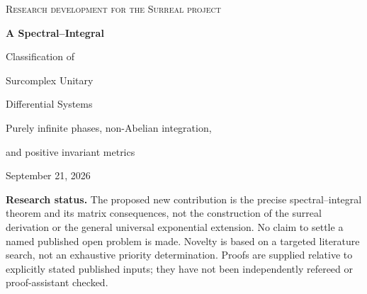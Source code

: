 \documentclass[11pt,a4paper]{article}
\numberwithin{equation}{section}
\theoremstyle{definition}
\theoremstyle{remark}
\newcommand{\No}{\mathbf{No}}
\newcommand{\K}{\mathbb K}
\newcommand{\OO}{\mathcal O}
\newcommand{\II}{\mathcal I}
\begin{document}
\hypersetup{pageanchor=false}
\begin{titlepage}
\centering
\vspace*{8mm}
{\large\scshape Research development for the Surreal project\par}
\vspace{12mm}
{\Huge\bfseries\color{Ink} A Spectral--Integral\par Classification of\par Surcomplex Unitary\par Differential Systems\par}
\vspace{8mm}
{\Large Purely infinite phases, non-Abelian integration,\par and positive invariant metrics\par}
\vspace{9mm}
{\large September 21, 2026\par}
\vspace{8mm}
\begin{minipage}{.95\textwidth}
\begin{abstract}
Fix the Berarducci--Mantova derivation on the surreal field, with
$\partial\omega=1$, and extend it to $\K=\No[i]$. Let
$\II=\partial\OO$ be the real coefficients with a finite primitive, and let
$\Psi(b)$ be the purely infinite part of any primitive of $b$.
We prove that, for an arbitrary finite Hermitian matrix $H$ over $\K$,
the complete differential phase spectrum of $\partial y=iHy$ is
\[
 \bigl\{\Psi(\lambda_1(H)),\ldots,\Psi(\lambda_n(H))\bigr\},
\]
where the $\lambda_j(H)$ are its ordinary algebraic eigenvalues in $\No$.
The formula needs neither commuting coefficients nor a spectral gap.
It yields an exact unitary normal form, a sharp finite-primitive
perturbation principle, and a normalized noncommutative integration theorem.

The proof combines established differential-field existence theorems with
an explicit phase classification and an order-theoretic estimate on bounded
gauges. We also classify all positive horizontal metrics of arbitrary
surcomplex systems, derive the real rotation-block form, and obtain a
positive Ermakov--Pinney existence/uniqueness dichotomy. An exact Hahn
construction for the oscillatory Airy equation illustrates the nonlinear
consequences. Further sections describe phase projectors, rational and
polynomial first integrals, and finite Picard--Vessiot tori.
\end{abstract}
\end{minipage}
\vfill
\begin{minipage}{.95\textwidth}\small
\textbf{Research status.} The proposed new contribution is the precise
spectral--integral theorem and its matrix consequences, not the construction
of the surreal derivation or the general universal exponential extension.
No claim to settle a named published open problem is made. Novelty is based
on a targeted literature search, not an exhaustive priority determination.
Proofs are supplied relative to explicitly stated published inputs; they
have not been independently refereed or proof-assistant checked.
\end{minipage}
\end{titlepage}
\end{document}
